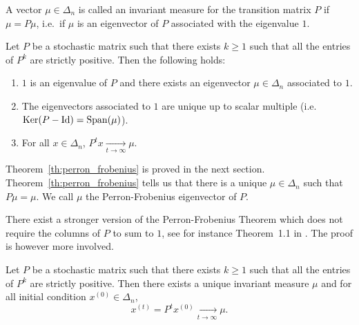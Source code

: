 \documentclass[11pt,nocut]{article}
\begin{document}
\begin{definition}
	A vector $\mu \in \Delta_n$ is called an invariant measure for the transition matrix $P$ if $\mu = P \mu$, i.e.\ if $\mu$ is an eigenvector of $P$ associated with the eigenvalue $1$.
\end{definition}



\begin{theorem}\label{th:perron_frobenius}
	Let $P$ be a stochastic matrix such that there exists $k \geq 1$ such that all the entries of $P^k$ are strictly positive. Then the following holds:
	\begin{enumerate}[label=(\roman*),noitemsep]
		\item\label{item:i} $1$ is an eigenvalue of $P$ and there exists an eigenvector $\mu \in \Delta_n$ associated to $1$.
		\item\label{item:ii} The eigenvectors associated to $1$ are unique up to scalar multiple (i.e.\ ${{\rm Ker}}(P-{{\rm Id}}) = {{\rm Span}}(\mu)$).
		\item\label{item:iii} For all $x \in \Delta_n$, $P^t x \xrightarrow[t \to \infty]{} \mu$.
	\end{enumerate}
\end{theorem}

Theorem~\ref{th:perron_frobenius} is proved in the next section.
Theorem~\ref{th:perron_frobenius} tells us that there is a unique $\mu \in \Delta_n$ such that $P \mu = \mu$. We call $\mu$ the Perron-Frobenius eigenvector of $P$.

\begin{remark}
	There exist a stronger version of the Perron-Frobenius Theorem which does not require the columns of $P$ to sum to $1$, see for instance Theorem~1.1 in \cite{seneta2006non}. The proof is however more involved.
\end{remark}

\begin{corollary}\label{cor:perron}
	Let $P$ be a stochastic matrix such that there exists $k \geq 1$ such that all the entries of $P^k$ are strictly positive. Then there exists a unique invariant measure $\mu$ and for all initial condition $x^{(0)} \in \Delta_n$,
	$$
	x^{(t)} = P^t x^{(0)} \xrightarrow[t \to \infty]{} \mu.
	$$
\end{corollary}
\end{document}

